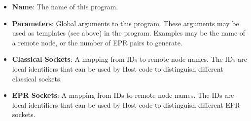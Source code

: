 \begin{itemize}
    \item \textbf{Name}: The name of this program.
    \item \textbf{Parameters}: Global arguments to this program. These arguments may be used as templates (see above) in the program. Examples may be the name of a remote node, or the number of EPR pairs to generate.
    \item \textbf{Classical Sockets}: A mapping from IDs to remote node names. The IDs are local identifiers that can be used by Host code to distinguish different classical sockets.
    \item \textbf{EPR Sockets}: A mapping from IDs to remote node names. The IDs are local identifiers that can be used by Host code to distinguish different EPR sockets.
\end{itemize}




